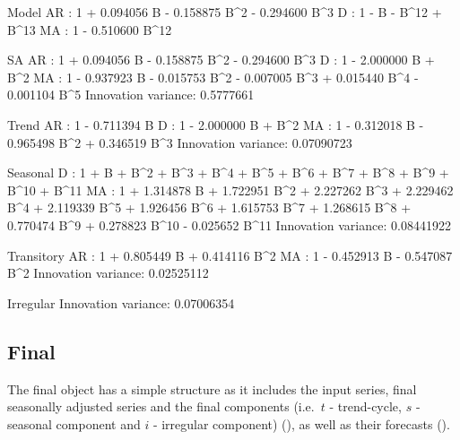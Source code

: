 \documentclass[article]{jss}
\begin{document}
\begin{CodeChunk}


\begin{CodeOutput}
Model
AR :  1 + 0.094056 B - 0.158875 B^2 - 0.294600 B^3 
D :  1 - B - B^12 + B^13 
MA :  1 - 0.510600 B^12 


SA
AR :  1 + 0.094056 B - 0.158875 B^2 - 0.294600 B^3 
D :  1 - 2.000000 B + B^2 
MA :  1 - 0.937923 B - 0.015753 B^2 - 0.007005 B^3 + 0.015440 B^4 - 0.001104 B^5 
Innovation variance:  0.5777661 

Trend
AR :  1 - 0.711394 B 
D :  1 - 2.000000 B + B^2 
MA :  1 - 0.312018 B - 0.965498 B^2 + 0.346519 B^3 
Innovation variance:  0.07090723 

Seasonal
D :  1 + B + B^2 + B^3 + B^4 + B^5 + B^6 + B^7 + B^8 + B^9 + B^10 + B^11 
MA :  1 + 1.314878 B + 1.722951 B^2 + 2.227262 B^3 + 2.229462 B^4 + 2.119339 B^5 + 1.926456 B^6 + 1.615753 B^7 + 1.268615 B^8 + 0.770474 B^9 + 0.278823 B^10 - 0.025652 B^11 
Innovation variance:  0.08441922 

Transitory
AR :  1 + 0.805449 B + 0.414116 B^2 
MA :  1 - 0.452913 B - 0.547087 B^2 
Innovation variance:  0.02525112 

Irregular
Innovation variance:  0.07006354 
\end{CodeOutput}
\end{CodeChunk}

\hypertarget{final}{%
\subsection{Final}\label{final}}

The final object has a simple structure as it includes the input series,
final seasonally adjusted series and the final components (i.e.~\(t\) -
trend-cycle, \(s\) - seasonal component and \(i\) - irregular component)
(), as well as their forecasts ().
\end{document}
